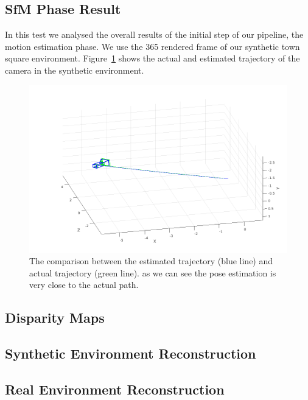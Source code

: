 \subsection{SfM Phase Result}
In this test we analysed the overall results of the initial step of our
pipeline, the motion estimation phase. We use the 365 rendered frame of our
synthetic town square environment. Figure~\ref{fig:trajectory} shows the actual
and estimated trajectory of the camera in the synthetic environment.
%
\begin{figure}[h]
\centering
\includegraphics[width=\linewidth]{img/trajectory.png}
\caption{The comparison between the estimated trajectory (blue line) and
actual trajectory (green line). as we can see the pose estimation is very close
to the actual path.}
\label{fig:trajectory}
\end{figure}
%
\subsection{Disparity Maps}

\subsection{Synthetic Environment Reconstruction}

\subsection{Real Environment Reconstruction}
